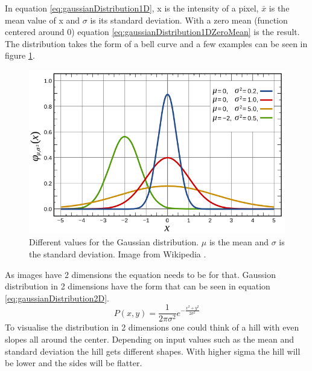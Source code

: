 In equation \ref{eq:gaussianDistribution1D}, x is the intensity of a pixel, \(\bar{x}\)
is the mean value of x and \(\sigma\) is its standard deviation. With a zero mean
(function centered around 0) equation \ref{eq:gaussianDistribution1DZeroMean} is the result.
The distribution takes the form of a bell curve and a few examples can be seen in figure
\ref{fig:gaussian1d}.
\begin{figure}[ht]
    \begin{minipage}[t]{\linewidth}
        \centering
        \includegraphics[width=\textwidth]{images/gaussian1d.png}
        \caption{Different values for the Gaussian distribution. \(\mu\) is the mean and \(\sigma\) is the standard deviation. Image from Wikipedia \cite{wiki:distributionGraph}.}
        \label{fig:gaussian1d}
    \end{minipage}
\end{figure}
As images have 2 dimensions the equation needs to be for that. Gaussion distribution in 2
dimensions have the form that can be seen in equation \ref{eq:gaussianDistribution2D}.
\begin{equation}
    \label{eq:gaussianDistribution2D}
    P(x,y) = \frac{1}{{ 2\pi \sigma^2}}e^{- \frac{x^2 + y^2}{2 \sigma^2}}
\end{equation}
To visualise the distribution in 2 dimensions one could think of a hill with even
slopes all around the center. Depending on input values such as the mean and
standard deviation the hill gets different shapes. With higher sigma the
hill will be lower and the sides will be flatter.


